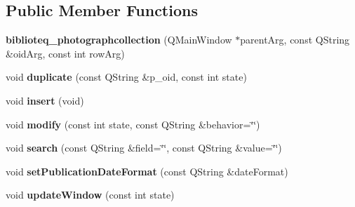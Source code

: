 \subsection*{Public Member Functions}
\begin{DoxyCompactItemize}
\item 
{\bfseries biblioteq\+\_\+photographcollection} (Q\+Main\+Window $\ast$parent\+Arg, const Q\+String \&oid\+Arg, const int row\+Arg)\hypertarget{classbiblioteq__photographcollection_ac498eab395a4366771c61796925de6c9}{}\label{classbiblioteq__photographcollection_ac498eab395a4366771c61796925de6c9}

\item 
void {\bfseries duplicate} (const Q\+String \&p\+\_\+oid, const int state)\hypertarget{classbiblioteq__photographcollection_a127c663fb85821551cb1fa0a7a14f63e}{}\label{classbiblioteq__photographcollection_a127c663fb85821551cb1fa0a7a14f63e}

\item 
void {\bfseries insert} (void)\hypertarget{classbiblioteq__photographcollection_aa275b2c143f3f67af3c12ce4964f936d}{}\label{classbiblioteq__photographcollection_aa275b2c143f3f67af3c12ce4964f936d}

\item 
void {\bfseries modify} (const int state, const Q\+String \&behavior=\char`\"{}\char`\"{})\hypertarget{classbiblioteq__photographcollection_a9ba80a269f6b45191a431bfcad60caf5}{}\label{classbiblioteq__photographcollection_a9ba80a269f6b45191a431bfcad60caf5}

\item 
void {\bfseries search} (const Q\+String \&field=\char`\"{}\char`\"{}, const Q\+String \&value=\char`\"{}\char`\"{})\hypertarget{classbiblioteq__photographcollection_a8e8a2e45f3857ce754e4a9a4b054872f}{}\label{classbiblioteq__photographcollection_a8e8a2e45f3857ce754e4a9a4b054872f}

\item 
void {\bfseries set\+Publication\+Date\+Format} (const Q\+String \&date\+Format)\hypertarget{classbiblioteq__photographcollection_af202c0841e35c336c4c2b6bf46e11fab}{}\label{classbiblioteq__photographcollection_af202c0841e35c336c4c2b6bf46e11fab}

\item 
void {\bfseries update\+Window} (const int state)\hypertarget{classbiblioteq__photographcollection_af79d471e654afc1567d818879688bf3f}{}\label{classbiblioteq__photographcollection_af79d471e654afc1567d818879688bf3f}

\end{DoxyCompactItemize}
